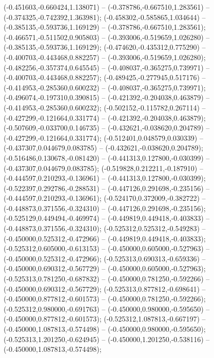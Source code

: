  (-0.451603,-0.660424,1.138071) -- (-0.378786,-0.667510,1.283561) -- (-0.374325,-0.742392,1.363981);
 (-0.458302,-0.585865,1.034644) -- (-0.385135,-0.593736,1.169129) -- (-0.378786,-0.667510,1.283561);
 (-0.466571,-0.511502,0.905803) -- (-0.393006,-0.519659,1.026280) -- (-0.385135,-0.593736,1.169129);
 (-0.474620,-0.435312,0.775290) -- (-0.400703,-0.443468,0.882257) -- (-0.393006,-0.519659,1.026280);
 (-0.482256,-0.357374,0.645545) -- (-0.408037,-0.365275,0.739971) -- (-0.400703,-0.443468,0.882257);
 (-0.489425,-0.277945,0.517176) -- (-0.414953,-0.285360,0.600232) -- (-0.408037,-0.365275,0.739971);
 (-0.496074,-0.197310,0.390815) -- (-0.421392,-0.204038,0.463879) -- (-0.414953,-0.285360,0.600232);
 (-0.502152,-0.115782,0.267114) -- (-0.427299,-0.121664,0.331774) -- (-0.421392,-0.204038,0.463879);
 (-0.507609,-0.033700,0.146735) -- (-0.432621,-0.038620,0.204789) -- (-0.427299,-0.121664,0.331774);
 (-0.512401,0.048579,0.030339) -- (-0.437307,0.044679,0.083785) -- (-0.432621,-0.038620,0.204789);
 (-0.516486,0.130678,-0.081420) -- (-0.441313,0.127800,-0.030399) -- (-0.437307,0.044679,0.083785);
 (-0.519828,0.212211,-0.187910) -- (-0.444597,0.210293,-0.136961) -- (-0.441313,0.127800,-0.030399);
 (-0.522397,0.292786,-0.288531) -- (-0.447126,0.291698,-0.235156) -- (-0.444597,0.210293,-0.136961);
 (-0.524170,0.372009,-0.382722) -- (-0.448873,0.371556,-0.324310) -- (-0.447126,0.291698,-0.235156);
 (-0.525129,0.449494,-0.469974) -- (-0.449819,0.449418,-0.403833) -- (-0.448873,0.371556,-0.324310);
 (-0.525312,0.525312,-0.549283) -- (-0.450000,0.525312,-0.472966) -- (-0.449819,0.449418,-0.403833);
 (-0.525312,0.605000,-0.613153) -- (-0.450000,0.605000,-0.527963) -- (-0.450000,0.525312,-0.472966);
 (-0.525313,0.690313,-0.659336) -- (-0.450000,0.690312,-0.567729) -- (-0.450000,0.605000,-0.527963);
 (-0.525313,0.781250,-0.687832) -- (-0.450000,0.781250,-0.592266) -- (-0.450000,0.690312,-0.567729);
 (-0.525313,0.877812,-0.698641) -- (-0.450000,0.877812,-0.601573) -- (-0.450000,0.781250,-0.592266);
 (-0.525312,0.980000,-0.691763) -- (-0.450000,0.980000,-0.595650) -- (-0.450000,0.877812,-0.601573);
 (-0.525312,1.087813,-0.667197) -- (-0.450000,1.087813,-0.574498) -- (-0.450000,0.980000,-0.595650);
 (-0.525313,1.201250,-0.624945) -- (-0.450000,1.201250,-0.538116) -- (-0.450000,1.087813,-0.574498);
